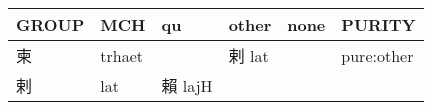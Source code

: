 \documentclass[14pt,a4paper]{scrartcl}
\begin{document}
\begin{longtable}[c]{@{}llllll@{}}
\toprule
\begin{minipage}[b]{0.14\columnwidth}\raggedright\strut
GROUP
\strut\end{minipage} &
\begin{minipage}[b]{0.14\columnwidth}\raggedright\strut
MCH
\strut\end{minipage} &
\begin{minipage}[b]{0.14\columnwidth}\raggedright\strut
qu
\strut\end{minipage} &
\begin{minipage}[b]{0.14\columnwidth}\raggedright\strut
other
\strut\end{minipage} &
\begin{minipage}[b]{0.14\columnwidth}\raggedright\strut
none
\strut\end{minipage} &
\begin{minipage}[b]{0.14\columnwidth}\raggedright\strut
PURITY
\strut\end{minipage}\tabularnewline
\midrule
\endhead
\begin{minipage}[t]{0.14\columnwidth}\raggedright\strut
柬
\strut\end{minipage} &
\begin{minipage}[t]{0.14\columnwidth}\raggedright\strut
trhaet
\strut\end{minipage} &
\begin{minipage}[t]{0.14\columnwidth}\raggedright\strut
\strut\end{minipage} &
\begin{minipage}[t]{0.14\columnwidth}\raggedright\strut
剌 lat
\strut\end{minipage} &
\begin{minipage}[t]{0.14\columnwidth}\raggedright\strut
\strut\end{minipage} &
\begin{minipage}[t]{0.14\columnwidth}\raggedright\strut
pure:other
\strut\end{minipage}\tabularnewline
\begin{minipage}[t]{0.14\columnwidth}\raggedright\strut
剌
\strut\end{minipage} &
\begin{minipage}[t]{0.14\columnwidth}\raggedright\strut
lat
\strut\end{minipage} &
\begin{minipage}[t]{0.14\columnwidth}\raggedright\strut
賴 lajH
\strut\end{minipage} &
\begin{minipage}[t]{0.14\columnwidth}\raggedright\strut

\end{minipage}
\end{longtable}
\end{document}
